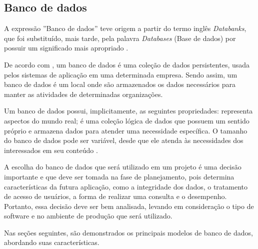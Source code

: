 \subsection{Banco de dados}

\par A expressão ''Banco de dados'' teve origem a partir do termo inglês \textit{Databanks}, que foi substituído, mais tarde, pela palavra \textit{Databases} (Base de dados)  por possuir um significado mais apropriado \cite {setzer_silva_banco_dados_aprenda_o_que_sao_melhore_conhecimento}.

\par De acordo com , um banco de dados é uma coleção de dados persistentes, usada pelos sistemas de aplicação em uma determinada empresa. Sendo assim, um banco de dados é um local onde são armazenados os dados necessários para manter as atividades de determinadas organizações.

\par Um banco de dados possui, implicitamente, as seguintes propriedades: representa aspectos do mundo real; é uma coleção lógica de dados que possuem um sentido próprio e armazena dados para atender uma necessidade específica. O tamanho do banco de dados pode ser variável, desde que ele atenda às necessidades dos interessados em seu conteúdo \cite{elmasri_navathe_sistemas_banco_dados}.

\par A escolha do banco de dados que será utilizado em um projeto é uma decisão importante e que deve ser tomada na fase de planejamento, pois determina características da futura aplicação, como a integridade dos dados, o tratamento de acesso de usuários, a forma de realizar uma consulta e o desempenho. Portanto, essa decisão deve ser bem analisada, levando em consideração o tipo de software e no ambiente de produção que será utilizado.

\par Nas seções seguintes, são demonstrados os principais modelos de banco de dados, abordando suas características.